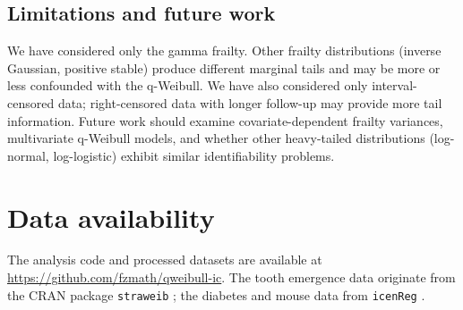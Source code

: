 \documentclass[12pt,a4paper]{article}
\begin{document}
\subsection{Limitations and future work}

We have considered only the gamma frailty. Other frailty distributions (inverse Gaussian, positive stable) produce different marginal tails and may be more or less confounded with the q-Weibull. We have also considered only interval-censored data; right-censored data with longer follow-up may provide more tail information. Future work should examine covariate-dependent frailty variances, multivariate q-Weibull models, and whether other heavy-tailed distributions (log-normal, log-logistic) exhibit similar identifiability problems.

\section*{Data availability}
The analysis code and processed datasets are available at \url{https://github.com/fzmath/qweibull-ic}. The tooth emergence data originate from the CRAN package \texttt{straweib} \citep{straweib}; the diabetes and mouse data from \texttt{icenReg} \citep{icenReg}.
\end{document}
